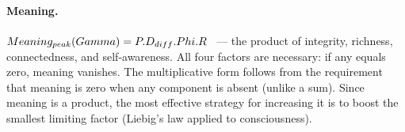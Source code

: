 \paragraph{Meaning.}
$Meaning_{peak}(Gamma) = P . D_{diff} . Phi .
R$~ --- the product of integrity, richness, connectedness, and self-awareness.
All four factors are necessary: if any equals zero, meaning vanishes. The multiplicative
form follows from the requirement that meaning is zero when any component is absent
(unlike a sum). Since meaning is a product, the most effective strategy for increasing it
is to boost the smallest limiting factor (Liebig's law applied to consciousness).
